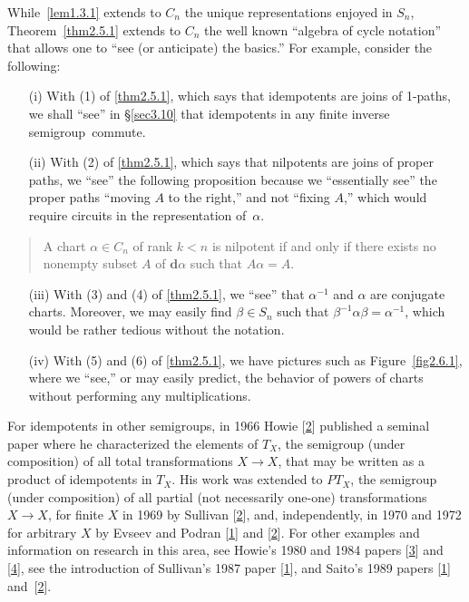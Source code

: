 \documentclass{surv-l}
\numberwithin{equation}{section}
\numberwithin{table}{section}
\numberwithin{figure}{section}
\theoremstyle{definition}
\begin{document}
While~\ref{lem1.3.1} extends to $C_{n}$ the unique representations
enjoyed in $S_{n}$, Theorem~\ref{thm2.5.1} extends to $C_{n}$ the
well known ``algebra of cycle notation'' that allows one to ``see (or anticipate) the basics.''
For example, consider the following:
\begin{enumerate}
\item[(i)] With (1) of \ref{thm2.5.1}, which says that idempotents are joins of
1-paths, we shall ``see'' in \S\ref{sec3.10} that idempotents
in any finite inverse semigroup~commute.

\item[(ii)] With (2) of \ref{thm2.5.1}, which says that nilpotents are joins of
proper paths, we ``see'' the following proposition because we
``essentially see'' the proper paths ``moving $A$ to the
right,'' and not ``fixing $A$,'' which would require circuits
in the representation of~$\alpha$.
\end{enumerate}
\begin{quote}
A chart $\alpha\in C_{n}$ of rank $k<n$ is nilpotent if and
only if there exists no nonempty subset $A$ of
$\mathbf{d}\alpha$ such that $A\alpha= A$.
\end{quote}
\begin{enumerate}
\item[(iii)] With (3) and (4) of \ref{thm2.5.1}, we ``see'' that $\alpha^{-1}$ and
$\alpha$ are conjugate charts. Moreover, we may easily find
$\beta\in S_{n}$ such that
$\beta^{-1}\alpha\beta=\alpha^{-1}$, which would be rather
tedious without the notation.

\item[(iv)] With (5) and (6) of \ref{thm2.5.1}, we have pictures such as Figure~\ref{fig2.6.1},
where we ``see,'' or may easily predict, the behavior of
powers of charts without performing any multiplications.
\end{enumerate}

For idempotents in other semigroups, in 1966 Howie
[\hyperlink{bib22a}{2}] published a seminal paper where
he characterized the elements of $T_{X}$, the semigroup (under
composition) of all total transformations $X\rightarrow X$, that
may be written as a product of idempotents in $T_{X}$. His work
was extended to $PT_{X}$, the semigroup (under composition) of all
partial (not necessarily one-one) transformations $X\rightarrow
X$, for finite $X$ in 1969 by Sullivan
[\hyperlink{bib72a}{2}], and, independently, in 1970 and
1972 for arbitrary $X$ by Evseev and
Podran [\hyperlink{bib15}{1}] and
[\hyperlink{bib15a}{2}]. For other examples and
information on research in this area, see Howie's 1980 and 1984
papers [\hyperlink{bib32b}{3}] and
[\hyperlink{bib32c}{4}], see the introduction of
Sullivan's 1987 paper
[\hyperlink{bib72}{1}], and Saito's 1989
papers [\hyperlink{bib67}{1}]
and~[\hyperlink{bib67a}{2}].
\end{document}
